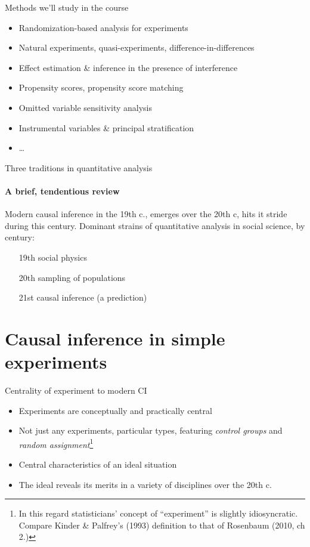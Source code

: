 

\begin{frame}[label=whatWeWillCoverFr]{Methods we'll study in the course}
  \begin{itemize}
  \item Randomization-based analysis for experiments
  \item Natural experiments, quasi-experiments,
    difference-in-differences
  \item Effect estimation \& inference in the presence of interference
  \item Propensity scores, propensity score matching
  \item Omitted variable sensitivity analysis
  \item Instrumental variables \& principal stratification
  \item \ldots
  \end{itemize}
\end{frame}


\begin{frame}{Three traditions in quantitative analysis}
\framesubtitle{A brief, tendentious review}

Modern causal inference in the 19th c., emerges over the 20th c, hits
it stride during this century. Dominant strains of quantitative
analysis in social science, by century:

\begin{itemize}
\item[19th] social physics
\item[20th] sampling of populations
\item[21st] causal inference (a prediction)
\end{itemize}

  
\end{frame}

\section{Causal inference in simple experiments}

\begin{frame}{Centrality of experiment to modern CI}
  \begin{itemize}
  \item Experiments are conceptually and practically central
  \item Not just any experiments, particular types, featuring
    \textit{control groups} and \textit{random assignment}\footnote{In
    this regard statisticians' concept of ``experiment'' is slightly
    idiosyncratic.  Compare Kinder \& Palfrey's (1993) definition to that of
    Rosenbaum (2010, ch 2.)}
  \item Central characteristics of an ideal situation
  \item The ideal reveals its merits in a variety of disciplines over
    the 20th c.
  \end{itemize}
\end{frame}

